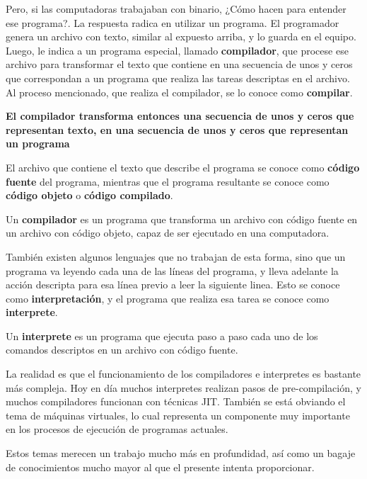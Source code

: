 Pero, si las computadoras trabajaban con binario, ¿Cómo hacen para entender ese
programa?. La respuesta radica en utilizar un programa. El programador genera un
archivo con texto, similar al expuesto arriba, y lo guarda en el equipo. Luego,
le indica a un programa especial, llamado \textbf{compilador}, que procese ese
archivo para transformar el texto que contiene en una secuencia de unos y ceros
que correspondan a un programa que realiza las tareas descriptas en el archivo.
Al proceso mencionado, que realiza el compilador, se lo conoce como \textbf{compilar}.

\textbf{El compilador transforma entonces una secuencia de unos y ceros que representan
texto, en una secuencia de unos y ceros que representan un programa}

El archivo que contiene el texto que describe el programa se conoce como
\textbf{código fuente} del programa, mientras que el programa resultante se conoce como
\textbf{código objeto} o \textbf{código compilado}.

\begin{definition}
    Un \textbf{compilador} es un programa que transforma un archivo con código fuente
    en un archivo con código objeto, capaz de ser ejecutado en una computadora.
\end{definition}

También existen algunos lenguajes que no trabajan de esta forma, sino que un programa
va leyendo cada una de las líneas del programa, y lleva adelante la acción descripta
para esa línea previo a leer la siguiente linea. Esto se conoce como \textbf{interpretación},
y el programa que realiza esa tarea se conoce como \textbf{interprete}.

\begin{definition}
    Un \textbf{interprete} es un programa que ejecuta paso a paso cada uno de los
    comandos descriptos en un archivo con código fuente.
\end{definition}

\begin{knowwhat}[Simplificación]
    La realidad es que el funcionamiento de los compiladores e interpretes es
    bastante más compleja. Hoy en día muchos interpretes realizan pasos de
    pre-compilación, y muchos compiladores funcionan con técnicas JIT. También
    se está obviando el tema de máquinas virtuales, lo cual representa un
    componente muy importante en los procesos de ejecución de programas actuales.

    Estos temas merecen un trabajo mucho más en profundidad, así como un bagaje
    de conocimientos mucho mayor al que el presente intenta proporcionar.
\end{knowwhat}

